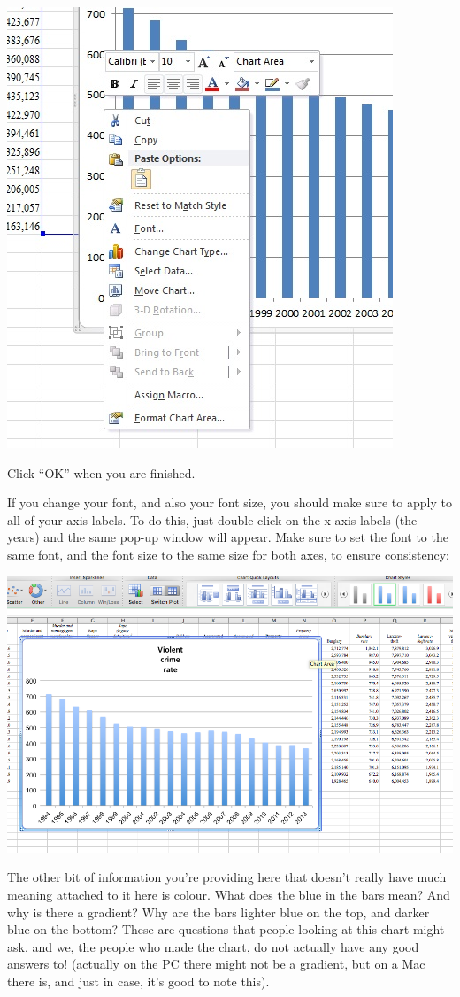 \documentclass[
]{book}
\begin{document}
\includegraphics{imgs/pc_change_font.jpg}

Click ``OK'' when you are finished.

If you change your font, and also your font size, you should make sure to apply to all of your axis labels. To do this, just double click on the x-axis labels (the years) and the same pop-up window will appear. Make sure to set the font to the same font, and the font size to the same size for both axes, to ensure consistency:

\includegraphics{imgs/desc_viz_10.png}

The other bit of information you're providing here that doesn't really have much meaning attached to it here is colour. What does the blue in the bars mean? And why is there a gradient? Why are the bars lighter blue on the top, and darker blue on the bottom? These are questions that people looking at this chart might ask, and we, the people who made the chart, do not actually have any good answers to!
(actually on the PC there might not be a gradient, but on a Mac there is, and just in case, it's good to note this).
\end{document}
